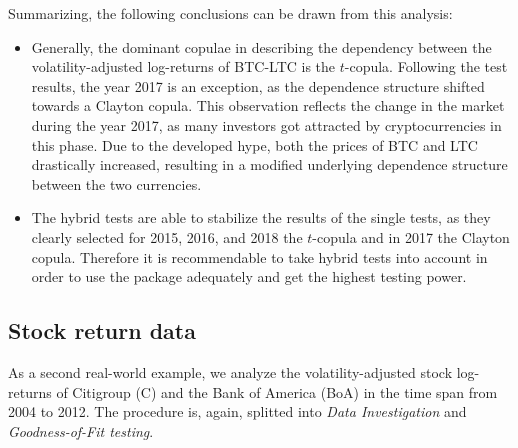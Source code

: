 Summarizing, the following conclusions can be drawn from this analysis:
\begin{itemize}
    \item Generally, the dominant copulae in describing the dependency between the volatility-adjusted log-returns of BTC-LTC is the $t$-copula. Following the test results, the year 2017 is an exception, as the dependence structure shifted towards a Clayton copula. This observation reflects the change in the market during the year 2017, as many investors got attracted by cryptocurrencies in this phase. Due to the developed hype, both the prices of BTC and LTC drastically increased, resulting in a modified underlying dependence structure between the two currencies.
    \item The hybrid tests are able to stabilize the results of the single tests, as they clearly selected for 2015, 2016, and 2018 the $t$-copula and in 2017 the Clayton copula. Therefore it is recommendable to take hybrid tests into account in order to use the package adequately and get the highest testing power.
\end{itemize}

\subsection{Stock return data}
\label{subsec:C_BoA}
As a second real-world example, we analyze the volatility-adjusted stock log-returns of Citigroup (C) and the Bank of America (BoA) in the time span from 2004 to 2012. The procedure is, again, splitted into \emph{Data Investigation} and \emph{Goodness-of-Fit testing}.

